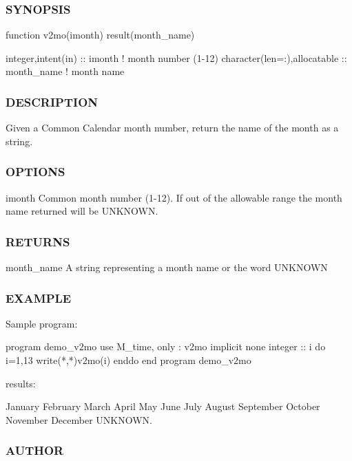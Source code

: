 \subsubsection*{S\+Y\+N\+O\+P\+S\+IS}

\begin{DoxyVerb}function v2mo(imonth) result(month_name)

 integer,intent(in)           :: imonth      ! month number (1-12)
 character(len=:),allocatable :: month_name  ! month name
\end{DoxyVerb}


\subsubsection*{D\+E\+S\+C\+R\+I\+P\+T\+I\+ON}

Given a Common Calendar month number, return the name of the month as a string.

\subsubsection*{O\+P\+T\+I\+O\+NS}

imonth Common month number (1-\/12). If out of the allowable range the month name returned will be \textquotesingle{}U\+N\+K\+N\+O\+WN\textquotesingle{}. \subsubsection*{R\+E\+T\+U\+R\+NS}

month\+\_\+name A string representing a month name or the word \textquotesingle{}U\+N\+K\+N\+O\+WN\textquotesingle{}

\subsubsection*{E\+X\+A\+M\+P\+LE}

\begin{DoxyVerb}Sample program:

 program demo_v2mo
 use M_time, only : v2mo
 implicit none
 integer :: i
    do i=1,13
       write(*,*)v2mo(i)
    enddo
 end program demo_v2mo

results:

 January
 February
 March
 April
 May
 June
 July
 August
 September
 October
 November
 December
 UNKNOWN.
\end{DoxyVerb}
 \subsubsection*{A\+U\+T\+H\+OR}

